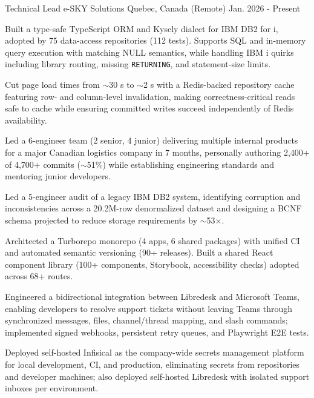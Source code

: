 

\begin{cventries}

  \cventry
   {Technical Lead} %
    {e-SKY Solutions} %
    {Quebec, Canada (Remote)} %
    {Jan. 2026 - Present} %
    {
      \begin{cvitems} %
        \item {Built a type-safe TypeScript ORM and Kysely dialect for IBM DB2 for i, adopted by 75 data-access repositories (112 tests). Supports SQL and in-memory query execution with matching NULL semantics, while handling IBM i quirks including library routing, missing \texttt{RETURNING}, and statement-size limits.}
        \item {Cut page load times from $\sim$30 s to $\sim$2 s with a Redis-backed repository cache featuring row- and column-level invalidation, making correctness-critical reads safe to cache while ensuring committed writes succeed independently of Redis availability.}
        \item {Led a 6-engineer team (2 senior, 4 junior) delivering multiple internal products for a major Canadian logistics company in 7 months, personally authoring 2,400+ of 4,700+ commits ($\sim$51\%) while establishing engineering standards and mentoring junior developers.}
        \item {Led a 5-engineer audit of a legacy IBM DB2 system, identifying corruption and inconsistencies across a 20.2M-row denormalized dataset and designing a BCNF schema projected to reduce storage requirements by $\sim$53$\times$.}
        \item {Architected a Turborepo monorepo (4 apps, 6 shared packages) with unified CI and automated semantic versioning (90+ releases). Built a shared React component library (100+ components, Storybook, accessibility checks) adopted across 68+ routes.}
        \item {Engineered a bidirectional integration between Libredesk and Microsoft Teams, enabling developers to resolve support tickets without leaving Teams through synchronized messages, files, channel/thread mapping, and slash commands; implemented signed webhooks, persistent retry queues, and Playwright E2E tests.}
        \item {Deployed self-hosted Infisical as the company-wide secrets management platform for local development, CI, and production, eliminating secrets from repositories and developer machines; also deployed self-hosted Libredesk with isolated support inboxes per environment.}
      \end{cvitems}
    }


\end{cventries}
